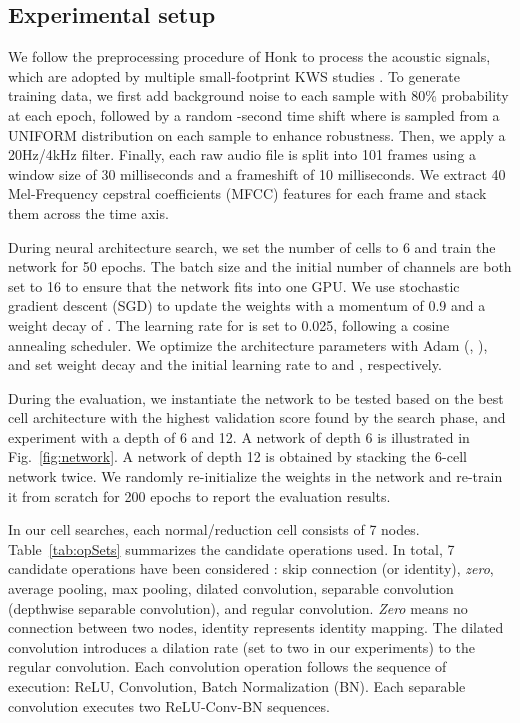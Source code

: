 \documentclass[a4paper]{article}
\begin{document}
 
\subsection{Experimental setup}



We follow the preprocessing procedure of Honk \cite{tang2017honk} to process the acoustic signals, which are adopted by multiple small-footprint KWS studies \cite{tang2017honk,tang2018deep,sainath2015convolutional,choi2019temporal,chen2019small}. To generate training data, we first add background noise to each sample with 80\% probability at each epoch, followed by a random -second time shift where  is sampled from a UNIFORM distribution on each sample to enhance robustness. Then, we apply a 20Hz/4kHz filter. 
Finally, each raw audio file is split into 101 frames using a window size of 30 milliseconds and a frameshift of 10 milliseconds. We extract 40 Mel-Frequency cepstral coefficients (MFCC) features for each frame and stack them across the time axis.


During neural architecture search, we set the number of cells to 6 and train the network for 50 epochs.
The batch size and the initial number of channels are both set to 16 to ensure that the network fits into one GPU. 
We use stochastic gradient descent (SGD) to update the weights  with a momentum of 0.9 and a weight decay of . The learning rate for  is set to 0.025, following a cosine annealing scheduler.
We optimize the architecture parameters  with Adam (, ), and set weight decay and the initial learning rate to   and , respectively.

During the evaluation, we instantiate the network to be tested based on the best cell architecture with the highest validation score found by the search phase, and experiment with a depth of 6 and 12. A network of depth 6 is illustrated in Fig.~\ref{fig:network}. A network of depth 12 is obtained by stacking the 6-cell network twice. 
We randomly re-initialize the weights in the network and re-train it from scratch for 200 epochs to report the evaluation results.





In our cell searches, each normal/reduction cell consists of 7 nodes.
Table~\ref{tab:opSets} summarizes the candidate operations used.
In total, 7 candidate operations have been considered : skip connection (or identity), \textit{zero}, average pooling, max pooling, dilated convolution,  separable convolution (depthwise separable convolution), and regular convolution. \textit{Zero} means no connection between two nodes, identity represents identity mapping. 
The dilated convolution introduces a dilation rate (set to two in our experiments) to the regular convolution.
Each convolution operation follows the sequence of execution: ReLU, Convolution, Batch Normalization (BN). Each separable convolution executes two ReLU-Conv-BN sequences.
\end{document}
